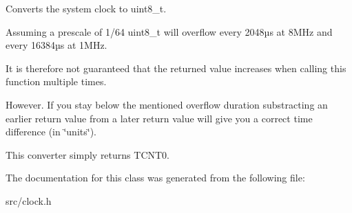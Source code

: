 Converts the system clock to {\ttfamily uint8\+\_\+t}. 

Assuming a prescale of 1/64 {\ttfamily uint8\+\_\+t} will overflow every 2\textquotesingle{}048µs at 8\+M\+Hz and every 16\textquotesingle{}384µs at 1\+M\+Hz.

It is therefore not guaranteed that the returned value increases when calling this function multiple times.

However. If you stay below the mentioned overflow duration substracting an earlier return value from a later return value will give you a correct time difference (in \char`\"{}units\char`\"{}).

This converter simply returns {\ttfamily T\+C\+N\+T0}. 

The documentation for this class was generated from the following file\+:\begin{DoxyCompactItemize}
\item 
src/clock.\+h\end{DoxyCompactItemize}

